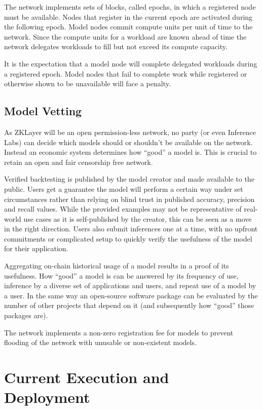 \documentclass[conference]{IEEEtran}
\begin{document}
The network implements sets of blocks, called epochs, in which a registered node must be available. Nodes that register in the current epoch are activated during the following epoch. Model nodes commit compute units per unit of time to the network. Since the compute units for a workload are known ahead of time the network delegates workloads to fill but not exceed its compute capacity.

It is the expectation that a model node will complete delegated workloads during a registered epoch. Model nodes that fail to complete work while registered or otherwise shown to be unavailable will face a penalty.

\subsection{Model Vetting}

As ZKLayer will be an open permission-less network, no party (or even Inference Labs) can decide which models should or shouldn’t be available on the network. Instead an economic system determines how “good” a model is. This is crucial to retain an open and fair censorship free network.

Verified backtesting is published by the model creator and made available to the public. Users get a guarantee the model will perform a certain way under set circumstances rather than relying on blind trust in published accuracy, precision and recall values. While the provided examples may not be representative of real-world use cases as it is self-published by the creator, this can be seen as a move in the right direction. Users also submit inferences one at a time, with no upfront commitments or complicated setup to quickly verify the usefulness of the model for their application.

Aggregating on-chain historical usage of a model results in a proof of its usefulness. How “good” a model is can be answered by its frequency of use, inference by a diverse set of applications and users, and repeat use of a model by a user. In the same way an open-source software package can be evaluated by the number of other projects that depend on it (and subsequently how “good” those packages are).

The network implements a non-zero registration fee for models to prevent flooding of the network with unusable or non-existent models.


\section{Current Execution and Deployment}
\end{document}
